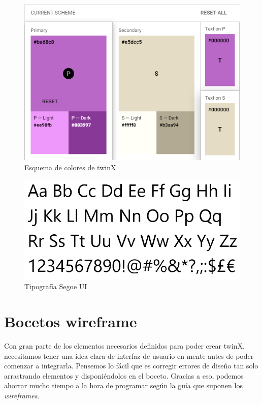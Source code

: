 \begin{figure}
	\centering
	\includegraphics{img/esquema_colores}
	\caption{Esquema de colores de twinX}
	\label{fig:esquemacolores}
\end{figure}

\begin{figure}
	\centering
	\includegraphics{img/segoeui}
	\caption{Tipografía Segoe UI}
	\label{fig:segoeui}
\end{figure}


\section{Bocetos wireframe}

Con gran parte de los elementos necesarios definidos para poder crear twinX, necesitamos tener una idea clara de interfaz de usuario en mente antes de poder comenzar a integrarla. Pensemos lo fácil que es corregir errores de diseño tan solo arrastrando elementos y disponiéndolos en el boceto. Gracias a eso, podemos ahorrar mucho tiempo a la hora de programar según la guía que suponen los \textit{wireframes}.

